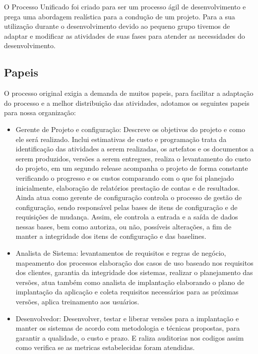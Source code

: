 \documentclass[	DIV=calc,%
							paper=a4,%
							fontsize=12pt,%
							onecolumn]{scrartcl}	 					%
\begin{document}
O Processo Unificado foi criado para ser um processo ágil de desenvolvimento e prega uma abordagem realística para a condução de um projeto. Para a sua utilização durante o desenvolvimento devido ao pequeno grupo tivemos de adaptar e modificar as atividades de suas fases para atender as necessidades do desenvolvimento.

\subsection{Papeis}

O processo original exigia a demanda de muitos papeis, para facilitar a adaptação do processo e a melhor distribuição das atividades, adotamos os seguintes papeis para nossa organização:

\begin{itemize}

	\item Gerente de Projeto e configuração: Descreve os objetivos do projeto e como ele será realizado. Inclui estimativas de custo e programação trata da identificação das atividades a serem realizadas, os artefatos e os documentos a serem produzidos, versões a serem entregues, realiza o levantamento do custo do projeto, em um segundo release acompanha o projeto de forma constante verificando o progresso e os custos  comparando com o que foi planejado inicialmente, elaboração de relatórios prestação de contas e de resultados. Ainda atua como gerente de configuração controla o processo de gestão de configuração, sendo responsável pelas bases de itens de configuração e de requisições de mudança. Assim, ele controla a entrada e a saída de dados nessas bases, bem como autoriza, ou não, possíveis alterações, a fim de manter a integridade dos itens de configuração e das baselines.

	\item Analista de Sistema: levantamentos de requisitos e regras de negócio, mapeamento dos processos elaboração dos casos de uso baseado nos requisitos dos clientes, garantia da integridade dos sistemas, realizar o planejamento das versões, atua também como analista de implantação elaborando o plano de implantação da aplicação e coleta requisitos necessários para as próximas versões, aplica treinamento aos usuários.

	\item Desenvolvedor: Desenvolver, testar e liberar versões para a implantação e manter os sistemas de acordo com metodologia e técnicas propostas, para garantir a qualidade, o custo e prazo. E raliza auditorias nos codigos assim como verifica se as metricas estabelecidas foram atendidas.
\end{itemize}  
\end{document}
